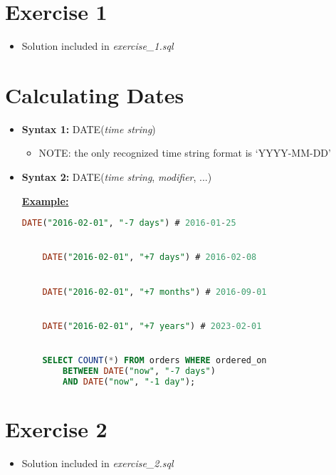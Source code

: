 \documentclass[12pt]{article}
\begin{document}
\bigskip

\section{Exercise 1}

\bigskip

\begin{itemize}
    \item Solution included in \textit{exercise\_1.sql}
\end{itemize}

\bigskip

\section{Calculating Dates}

\bigskip

\begin{itemize}
    \item \textbf{Syntax 1:} DATE(\textit{time string})
    \begin{itemize}
        \item NOTE: the only recognized time string format is `YYYY-MM-DD'
    \end{itemize}
    \item \textbf{Syntax 2:} DATE(\textit{time string}, \textit{modifier}, ...)

    \bigskip

    \underline{\textbf{Example:}}

    \bigskip

    \begin{lstlisting}[language=SQL]
    DATE("2016-02-01", "-7 days") # 2016-01-25


    DATE("2016-02-01", "+7 days") # 2016-02-08


    DATE("2016-02-01", "+7 months") # 2016-09-01


    DATE("2016-02-01", "+7 years") # 2023-02-01


    SELECT COUNT(*) FROM orders WHERE ordered_on
        BETWEEN DATE("now", "-7 days")
        AND DATE("now", "-1 day");
    \end{lstlisting}

\end{itemize}

\bigskip

\section{Exercise 2}

\bigskip

\begin{itemize}
    \item Solution included in \textit{exercise\_2.sql}
\end{itemize}

\bigskip
\end{document}
